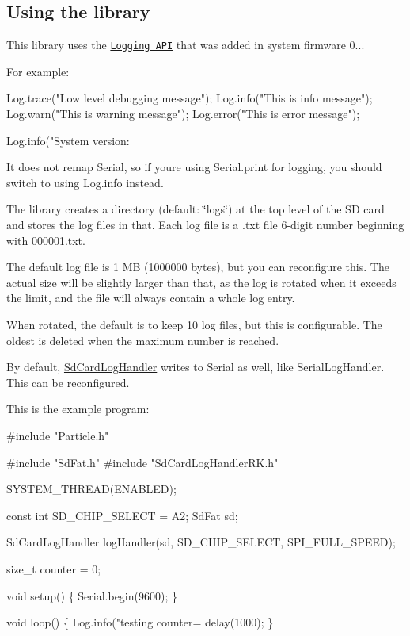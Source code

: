 \subsection*{Using the library}

This library uses the \href{https://docs.particle.io/reference/firmware/#logging}{\tt Logging A\+PI} that was added in system firmware 0...

For example\+:


\begin{DoxyCode}
Log.trace("Low level debugging message");
Log.info("This is info message");
Log.warn("This is warning message");
Log.error("This is error message");

Log.info("System version: %
\end{DoxyCode}


It does not remap Serial, so if you\textquotesingle{}re using Serial.\+print for logging, you should switch to using Log.\+info instead.

The library creates a directory (default\+: \char`\"{}logs\char`\"{}) at the top level of the SD card and stores the log files in that. Each log file is a .txt file 6-\/digit number beginning with 000001.\+txt.

The default log file is 1 MB (1000000 bytes), but you can reconfigure this. The actual size will be slightly larger than that, as the log is rotated when it exceeds the limit, and the file will always contain a whole log entry.

When rotated, the default is to keep 10 log files, but this is configurable. The oldest is deleted when the maximum number is reached.

By default, \mbox{\hyperlink{class_sd_card_log_handler}{Sd\+Card\+Log\+Handler}} writes to Serial as well, like Serial\+Log\+Handler. This can be reconfigured.

This is the example program\+:


\begin{DoxyCode}
#include "Particle.h"

#include "SdFat.h"
#include "SdCardLogHandlerRK.h"

SYSTEM\_THREAD(ENABLED);

const int SD\_CHIP\_SELECT = A2;
SdFat sd;

SdCardLogHandler logHandler(sd, SD\_CHIP\_SELECT, SPI\_FULL\_SPEED);

size\_t counter = 0;

void setup() \{
    Serial.begin(9600);
\}

void loop() \{
    Log.info("testing counter=%
    delay(1000);
\}
\end{DoxyCode}


